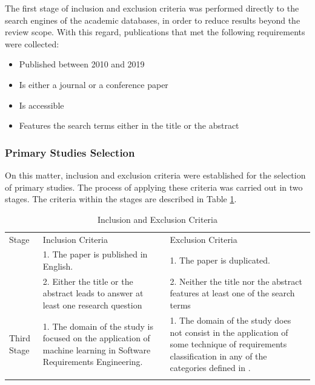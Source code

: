 \documentclass[conference]{IEEEtran}
\begin{document}
The first stage of inclusion and exclusion criteria was performed directly to the search engines of the academic databases, in order to reduce results beyond the review scope. With this regard, publications that met the following requirements were collected:

\begin{itemize}
  \item{Published between 2010 and 2019}
  \item{Is either a journal or a conference paper}
  \item{Is accessible}
  \item{Features the search terms either in the title or the abstract}
\end{itemize}

\subsubsection{Primary Studies Selection}

On this matter, inclusion and exclusion criteria were established for the selection of primary studies. The process of applying these criteria was carried out in two stages. The criteria within the stages are described in Table \ref{tab:inclusion-exclusion-criteria}.

\begin{table}[!htbp]
\caption{Inclusion and Exclusion Criteria}
\begin{center}
\label{tab:inclusion-exclusion-criteria}       %
\begin{tabular}{p{1.3cm}p{3cm}p{3cm}}
    \hline\noalign{\smallskip}
    Stage & Inclusion Criteria & Exclusion Criteria  \\
    \noalign{\smallskip}\hline\noalign{\smallskip}
    \multirow{2}{1.3cm}{Second Stage}& 1. The paper is published in English. & 1. The paper is duplicated. \\ & 2. Either the title or the abstract leads to answer at least one research question & 2. Neither the title nor the abstract features at least one of the search terms \\
    \hline\noalign{\smallskip}
    Third Stage & 1. The domain of the study is focused on the application of machine learning in Software Requirements Engineering. & 1. The domain of the study does not consist in the application of some technique of requirements classification in any of the categories defined in \cite{Wiegers2013}. \\
    \hline\noalign{\smallskip}
\end{tabular}
\end{center}
\end{table}
\end{document}
